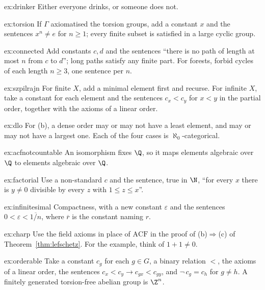 \begin{hint}{ex:drinker}
Either everyone drinks, or someone does not.
\end{hint}
\begin{hint}{ex:torsion}
If $\Gamma$ axiomatised the torsion groups, add a constant $x$ and the sentences $x^n\ne e$ for $n\ge1$; every finite subset is satisfied in a large cyclic group.
\end{hint}
\begin{hint}{ex:connected}
Add constants $c,d$ and the sentences ``there is no path of length at most $n$ from $c$ to $d$''; long paths satisfy any finite part. For forests, forbid cycles of each length $n\ge3$, one sentence per $n$.
\end{hint}
\begin{hint}{ex:szpilrajn}
For finite $X$, add a minimal element first and recurse. For infinite $X$, take a constant for each element and the sentences $c_x<c_y$ for $x<y$ in the partial order, together with the axioms of a linear order.
\end{hint}
\begin{hint}{ex:dlo}
For (b), a dense order may or may not have a least element, and may or may not have a largest one. Each of the four cases is $\aleph_0$-categorical.
\end{hint}
\begin{hint}{ex:acfnotcountable}
An isomorphism fixes $\Q$, so it maps elements algebraic over $\Q$ to elements algebraic over $\Q$.
\end{hint}
\begin{hint}{ex:factorial}
Use a non-standard $c$ and the sentence, true in $\N$, ``for every $x$ there is $y\ne0$ divisible by every $z$ with $1\le z\le x$''.
\end{hint}
\begin{hint}{ex:infinitesimal}
Compactness, with a new constant $\varepsilon$ and the sentences $0<\varepsilon<\overline{1/n}$, where $\overline r$ is the constant naming $r$.
\end{hint}
\begin{hint}{ex:charp}
Use the field axioms in place of $\mathrm{ACF}$ in the proof of (b)$\Rightarrow$(c) of Theorem~\ref{thm:lefschetz}. For the example, think of $1+1\ne0$.
\end{hint}
\begin{hint}{ex:orderable}
Take a constant $c_g$ for each $g\in G$, a binary relation $<$, the axioms of a linear order, the sentences $c_x<c_y\to c_{gx}<c_{gy}$, and $\neg\,c_g=c_h$ for $g\ne h$. A finitely generated torsion-free abelian group is $\Z^n$.
\end{hint}

